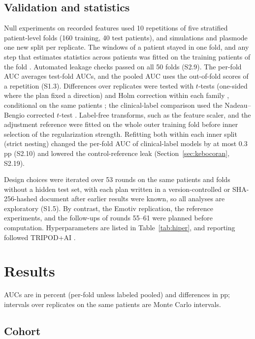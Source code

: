 \documentclass[final,1p,times]{elsarticle}
\begin{document}
\subsection{Validation and statistics}\label{sec:validasi}

Null experiments on recorded features used 10 repetitions of five stratified patient-level folds (160 training, 40 test patients), and simulations and plasmode one new split per replicate. The windows of a patient stayed in one fold, and any step that estimates statistics across patients was fitted on the training patients of the fold \cite{varma2006,rosenblatt2024,delpup2025,brookshire2024}. Automated leakage checks passed on all 50 folds (S2.9). The per-fold AUC averages test-fold AUCs, and the pooled AUC uses the out-of-fold scores of a repetition (S1.3). Differences over replicates were tested with $t$-tests (one-sided where the plan fixed a direction) and Holm correction within each family \cite{holm1979}, conditional on the same patients \cite{bates2024}; the clinical-label comparison used the Nadeau--Bengio corrected $t$-test \cite{nadeau2003}. Label-free transforms, such as the feature scaler, and the adjustment reference were fitted on the whole outer training fold before inner selection of the regularization strength. Refitting both within each inner split (strict nesting) changed the per-fold AUC of clinical-label models by at most 0.3 pp (S2.10) and lowered the control-reference leak (Section~\ref{sec:kebocoran}, S2.19).

Design choices were iterated over 53 rounds on the same patients and folds without a hidden test set, with each plan written in a version-controlled or SHA-256-hashed document after earlier results were known, so all analyses are exploratory (S1.5). By contrast, the Emotiv replication, the reference experiments, and the follow-ups of rounds 55--61 were planned before computation. Hyperparameters are listed in Table~\ref{tab:hiper}, and reporting followed TRIPOD+AI \cite{collins2024tripod}.%
\section{Results}\label{sec:results}

AUCs are in percent (per-fold unless labeled pooled) and differences in pp; intervals over replicates on the same patients are Monte Carlo intervals.

\subsection{Cohort}\label{sec:populasi}
\end{document}
